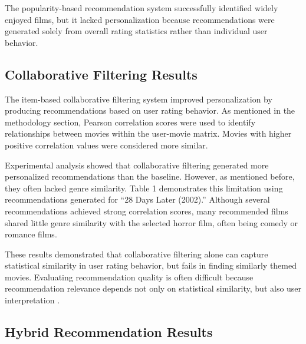 \documentclass{article}
\begin{document}
The popularity-based recommendation system successfully identified widely enjoyed films, but it lacked personalization because recommendations were generated solely from overall rating statistics rather than individual user behavior.

\subsection{Collaborative Filtering Results}

The item-based collaborative filtering system improved personalization by producing recommendations based on user rating behavior. As mentioned in the methodology section, Pearson correlation scores were used to identify relationships between movies within the user-movie matrix. Movies with higher positive correlation values were considered more similar.

Experimental analysis showed that collaborative filtering generated more personalized recommendations than the baseline. However, as mentioned before, they often lacked genre similarity. Table 1 demonstrates this limitation using recommendations generated for ``28 Days Later (2002).'' Although several recommendations achieved strong correlation scores, many recommended films shared little genre similarity with the selected horror film, often being comedy or romance films.

These results demonstrated that collaborative filtering alone can capture statistical similarity in user rating behavior, but fails in finding similarly themed movies. Evaluating recommendation quality is often difficult because recommendation relevance depends not only on statistical similarity, but also user interpretation \cite{herlocker2004evaluating}.

\subsection{Hybrid Recommendation Results}
\end{document}
